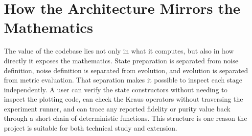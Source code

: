 \section{How the Architecture Mirrors the Mathematics}

The value of the codebase lies not only in what it computes, but also in how directly it exposes the mathematics. State preparation is separated from noise definition, noise definition is separated from evolution, and evolution is separated from metric evaluation. That separation makes it possible to inspect each stage independently. A user can verify the state constructors without needing to inspect the plotting code, can check the Kraus operators without traversing the experiment runner, and can trace any reported fidelity or purity value back through a short chain of deterministic functions. This structure is one reason the project is suitable for both technical study and extension.
